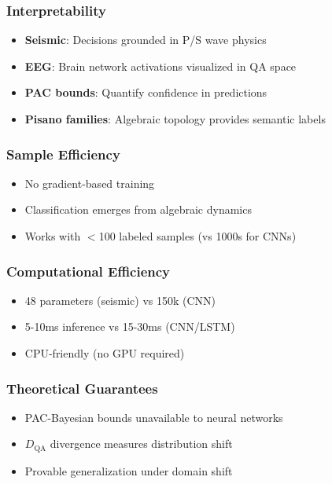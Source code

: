 \documentclass[11pt]{article}
\theoremstyle{remark}
\begin{document}
\subsubsection{Interpretability}
\begin{itemize}
\item \textbf{Seismic}: Decisions grounded in P/S wave physics
\item \textbf{EEG}: Brain network activations visualized in QA space
\item \textbf{PAC bounds}: Quantify confidence in predictions
\item \textbf{Pisano families}: Algebraic topology provides semantic labels
\end{itemize}

\subsubsection{Sample Efficiency}
\begin{itemize}
\item No gradient-based training
\item Classification emerges from algebraic dynamics
\item Works with $<$100 labeled samples (vs 1000s for CNNs)
\end{itemize}

\subsubsection{Computational Efficiency}
\begin{itemize}
\item 48 parameters (seismic) vs 150k (CNN)
\item 5-10ms inference vs 15-30ms (CNN/LSTM)
\item CPU-friendly (no GPU required)
\end{itemize}

\subsubsection{Theoretical Guarantees}
\begin{itemize}
\item PAC-Bayesian bounds unavailable to neural networks
\item $D_{\text{QA}}$ divergence measures distribution shift
\item Provable generalization under domain shift
\end{itemize}
\end{document}
